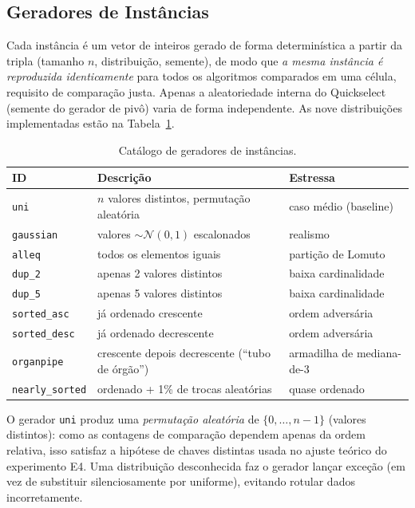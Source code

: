 \documentclass{infufrgs}
\begin{document}
\subsection{Geradores de Instâncias}

Cada instância é um vetor de inteiros gerado de forma determinística a partir da tripla (tamanho $n$, distribuição, semente), de modo que \emph{a mesma instância é reproduzida identicamente} para todos os algoritmos comparados em uma célula, requisito de comparação justa. Apenas a aleatoriedade interna do Quickselect (semente do gerador de pivô) varia de forma independente. As nove distribuições implementadas estão na Tabela~\ref{tab:geradores}.

\begin{table}[H]
\centering
\caption{Catálogo de geradores de instâncias.}
\label{tab:geradores}
\begin{tabular}{lll}
\toprule
\textbf{ID} & \textbf{Descrição} & \textbf{Estressa} \\
\midrule
\texttt{uni}           & $n$ valores distintos, permutação aleatória   & caso médio (baseline) \\
\texttt{gaussian}      & valores $\sim \mathcal{N}(0,1)$ escalonados    & realismo \\
\texttt{alleq}         & todos os elementos iguais                      & partição de Lomuto \\
\texttt{dup\_2}        & apenas 2 valores distintos                     & baixa cardinalidade \\
\texttt{dup\_5}        & apenas 5 valores distintos                     & baixa cardinalidade \\
\texttt{sorted\_asc}   & já ordenado crescente                          & ordem adversária \\
\texttt{sorted\_desc}  & já ordenado decrescente                        & ordem adversária \\
\texttt{organpipe}     & crescente depois decrescente (``tubo de órgão'') & armadilha de mediana-de-3 \\
\texttt{nearly\_sorted}& ordenado + 1\% de trocas aleatórias            & quase ordenado \\
\bottomrule
\end{tabular}
\end{table}

O gerador \texttt{uni} produz uma \emph{permutação aleatória} de $\{0,\dots,n-1\}$ (valores distintos): como as contagens de comparação dependem apenas da ordem relativa, isso satisfaz a hipótese de chaves distintas usada no ajuste teórico do experimento E4. Uma distribuição desconhecida faz o gerador lançar exceção (em vez de substituir silenciosamente por uniforme), evitando rotular dados incorretamente.
\end{document}
